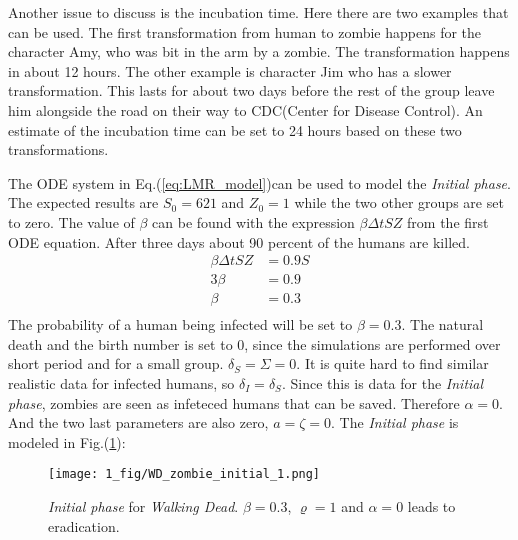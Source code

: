 \documentclass[%
twoside,                 %
final,                   %
chapterprefix=true,      %
open=right               %
10pt]{book}
\begin{document}
\vspace{3mm}




\vspace{3mm}


Another issue to discuss is the incubation time. Here there are two examples that can be used. The first transformation from human to zombie happens for the character Amy, who was bit in the arm by a zombie. The transformation happens in about 12 hours. The other example is character Jim who has a slower transformation. This lasts for about two days before the rest of the group leave him alongside the road on their way to CDC(Center for Disease Control). An estimate of the incubation time can be set to 24 hours based on these two transformations.


\vspace{3mm}




\vspace{3mm}


The ODE system in Eq.(\ref{eq:LMR_model})can be used to model the \emph{Initial phase}. The expected results are $S_0 = 621$ and $Z_0 = 1$ while the two other groups are set to zero. The value of $\beta$ can be found with the expression $\beta \Delta t S Z$ from the first ODE equation. After three days about 90 percent of the humans are killed.
\begin{equation}
	\begin{aligned}
	\beta\Delta t S Z &= 0.9 S\\
	3\beta   &= 0.9 \\
	\beta &= 0.3 \\
	\end{aligned}
\end{equation}
The probability of a human being infected will be set to $\beta = 0.3$. The natural death and the birth number is set to 0, since the simulations are performed over short period and for a small group. $\delta_S = \Sigma = 0$. It is quite hard to find similar realistic data for infected humans, so $\delta_I = \delta_S$. Since this is data for the \emph{Initial phase}, zombies are seen as infeteced humans that can be saved. Therefore $\alpha = 0$. And the two last parameters are also zero, $a = \zeta = 0$. The \emph{Initial phase} is modeled in Fig.(\ref{fig:initial_phase_1}):


\begin{figure}[ht]
  \centerline{\texttt{[image: 1\_fig/WD\_zombie\_initial\_1.png]}}
  \caption{
  \label{fig:initial_phase_1} \emph{Initial phase} for \emph{Walking Dead}. $\beta=0.3$, $\varrho=1$ and $\alpha=0$ leads to eradication.
  }
\end{figure}
\end{document}
